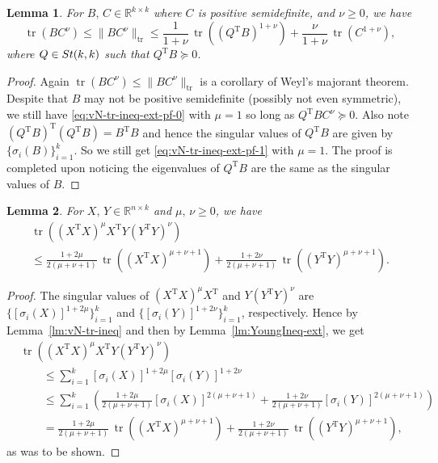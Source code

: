 \documentclass[11pt]{article}
\def\bbR{\mathbb{R}}
\newcommand\STM[2]{{\rm St}(#1,#2)}
\DeclareMathOperator{\tr}{tr}
\DeclareMathOperator{\T}{T}
\newtheorem{lemma}{Lemma}[section]
\theoremstyle{definition}
\numberwithin{equation}{section}
\begin{document}
\begin{lemma}\label{lm:vN-tr-ineq-ext1}
For $B,\,C\in\bbR^{k\times k}$ where $C$ is positive semidefinite, and $\nu\ge 0$,  we have
$$
\tr(BC^{\nu})\le\|BC^{\nu}\|_{\tr}\le\frac {1}{1+\nu}\, \tr((Q^{\T}B)^{1+\nu})+\frac {\nu}{1+\nu}\, \tr(C^{1+\nu}),
$$
where $Q\in\STM{k}{k}$ such that $Q^{\T}B\succeq 0$.
\end{lemma}

\begin{proof}
Again $\tr(BC^{\nu})\le\|BC^{\nu}\|_{\tr}$ is a corollary of Weyl's majorant theorem. Despite that $B$ may not be positive semidefinite (possibly not even symmetric), we still have  \eqref{eq:vN-tr-ineq-ext-pf-0} with $\mu=1$ so long as $Q^{\T}BC^{\nu}\succeq 0$. Also note
$(Q^{\T}B)^{\T}(Q^{\T}B)=B^{\T}B$ and hence
the singular values of $Q^{\T}B$ are given by $\{\sigma_i(B)\}_{i=1}^k$. So
we still get \eqref{eq:vN-tr-ineq-ext-pf-1} with $\mu=1$.
The proof is completed upon noticing the eigenvalues of $Q^{\T}B$ are the same as the singular values of $B$.
\end{proof}

\begin{lemma}\label{lm:vN-tr-ineq-ext2}
For $X,\,Y\in\bbR^{n\times k}$ and $\mu,\,\nu\ge 0$,  we have
\begin{multline*}
\tr((X^{\T}X)^{\mu}X^{\T}Y(Y^{\T}Y)^{\nu}) \\
   \le\frac {1+2\mu}{2(\mu+\nu+1)}\,\tr((X^{\T}X)^{\mu+\nu+1})+\frac {1+2\nu}{2(\mu+\nu+1)}\,\tr((Y^{\T}Y)^{\mu+\nu+1}).
\end{multline*}
\end{lemma}

\begin{proof}
The singular values of $(X^{\T}X)^{\mu}X^{\T}$ and $Y(Y^{\T}Y)^{\nu}$ are $\{[\sigma_i(X)]^{1+2\mu}\}_{i=1}^k$
and \linebreak $\{[\sigma_i(Y)]^{1+2\nu}\}_{i=1}^k$, respectively. Hence by Lemma~\ref{lm:vN-tr-ineq} and then by Lemma~\ref{lm:YoungIneq-ext},
we get
\begin{align*}
&\tr((X^{\T}X)^{\mu}X^{\T}Y(Y^{\T}Y)^{\nu}) \\
  &\qquad\le \sum_{i=1}^k[\sigma_i(X)]^{1+2\mu}[\sigma_i(Y)]^{1+2\nu} \\
  &\qquad\le \sum_{i=1}^k\left(\frac {1+2\mu}{2(\mu+\nu+1)}[\sigma_i(X)]^{2(\mu+\nu+1)}
                +\frac {1+2\nu}{2(\mu+\nu+1)}[\sigma_i(Y)]^{2(\mu+\nu+1)}\right)        \\
  &\qquad=\frac {1+2\mu}{2(\mu+\nu+1)}\,\tr((X^{\T}X)^{\mu+\nu+1})+\frac {1+2\nu}{2(\mu+\nu+1)}\,\tr((Y^{\T}Y)^{\mu+\nu+1}),
\end{align*}
as was to be shown.
\end{proof}
\end{document}
